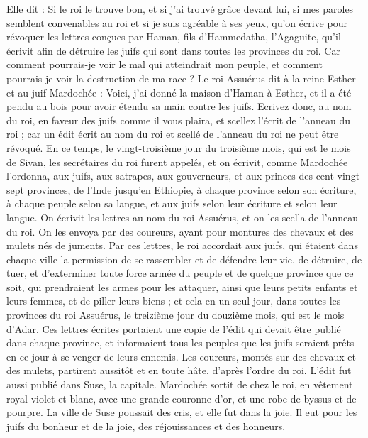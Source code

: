 \begin{multicols}{2}
Elle dit : Si le roi le trouve bon, et si j'ai trouvé grâce devant lui, si mes paroles semblent convenables au roi et si je suis agréable à ses yeux, qu'on écrive pour révoquer les lettres conçues par Haman, fils d'Hammedatha, l’Agaguite, qu'il écrivit afin de détruire les juifs qui sont dans toutes les provinces du roi.
Car comment pourrais-je voir le mal qui atteindrait mon peuple, et comment pourrais-je voir la destruction de ma race ?
Le roi Assuérus dit à la reine Esther et au juif Mardochée : Voici, j'ai donné la maison d'Haman à Esther, et il a été pendu au bois pour avoir étendu sa main contre les juifs.
Ecrivez donc, au nom du roi, en faveur des juifs comme il vous plaira, et scellez l'écrit de l'anneau du roi ; car un édit écrit au nom du roi et scellé de l'anneau du roi ne peut être révoqué.
En ce temps, le vingt-troisième jour du troisième mois, qui est le mois de Sivan, les secrétaires du roi furent appelés, et on écrivit, comme Mardochée l’ordonna, aux juifs, aux satrapes, aux gouverneurs, et aux princes des cent vingt-sept provinces, de l’Inde jusqu'en Ethiopie, à chaque province selon son écriture, à chaque peuple selon sa langue, et aux juifs selon leur écriture et selon leur langue.
On écrivit les lettres au nom du roi Assuérus, et on les scella de l'anneau du roi. On les envoya par des coureurs, ayant pour montures des chevaux et des mulets nés de juments.
Par ces lettres, le roi accordait aux juifs, qui étaient dans chaque ville la permission de se rassembler et de défendre leur vie, de détruire, de tuer, et d’exterminer toute force armée du peuple et de quelque province que ce soit, qui prendraient les armes pour les attaquer, ainsi que leurs petits enfants et leurs femmes, et de piller leurs biens ;
et cela en un seul jour, dans toutes les provinces du roi Assuérus, le treizième jour du douzième mois, qui est le mois d'Adar.
Ces lettres écrites portaient une copie de l’édit qui devait être publié dans chaque province, et informaient tous les peuples que les juifs seraient prêts en ce jour à se venger de leurs ennemis.
Les coureurs, montés sur des chevaux et des mulets, partirent aussitôt et en toute hâte, d’après l’ordre du roi. L'édit fut aussi publié dans Suse, la capitale.
Mardochée sortit de chez le roi, en vêtement royal violet et blanc, avec une grande couronne d'or, et une robe de byssus et de pourpre. La ville de Suse poussait des cris, et elle fut dans la joie.
Il eut pour les juifs du bonheur et de la joie, des réjouissances et des honneurs.

\end{multicols}
